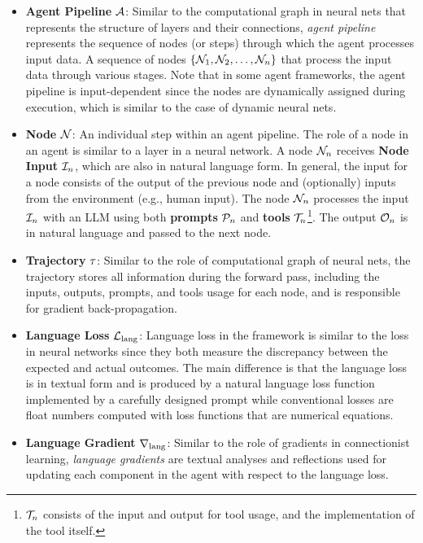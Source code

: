 \begin{itemize}
    
    \item \textbf{Agent Pipeline} $\mathcal{A}$: Similar to the computational graph in neural nets that represents the structure of layers and their connections, \textit{agent pipeline} represents the sequence of nodes (or steps) through which the agent processes input data. A sequence of nodes $\{\mathcal{N}_1, \mathcal{N}_2, \ldots, \mathcal{N}_n\}$ that process the input data through various stages. Note that in some agent frameworks, the agent pipeline is input-dependent since the nodes are dynamically assigned during execution, which is similar to the case of dynamic neural nets.

    \item \textbf{Node} $\mathcal{N}$: An individual step within an agent pipeline. The role of a node in an agent is similar to a layer in a neural network. A node $\mathcal{N}_n$ receives \textbf{Node Input} $\mathcal{I}_n$, which are also in natural language form. In general, the input for a node consists of the output of the previous node and (optionally) inputs from the environment (e.g., human input). The node $\mathcal{N}_n$ processes the input $\mathcal{I}_n$ with an LLM using both \textbf{prompts} $\mathcal{P}_n$ and \textbf{tools} $\mathcal{T}_n$\footnote{$\mathcal{T}_n$ consists of the input and output for tool usage, and the implementation of the tool itself.}. The output $\mathcal{O}_n$ is in natural language and passed to the next node.
        
        
    \item \textbf{Trajectory} $\tau$: Similar to the role of computational graph of neural nets, the trajectory stores all information during the forward pass, including the inputs, outputs, prompts, and tools usage for each node, and is responsible for gradient back-propagation.
    
    \item \textbf{Language Loss} $\mathcal{L}_{\text{lang}}$: Language loss in the \baby framework is similar to the loss in neural networks since they both measure the discrepancy between the expected and actual outcomes. The main difference is that the language loss is in textual form and is produced by a natural language loss function implemented by a carefully designed prompt while conventional losses are float numbers computed with loss functions that are numerical equations. 
    
    \item \textbf{Language Gradient} $\nabla_{\text{lang}}$: Similar to the role of gradients in connectionist learning, \textit{language gradients} are textual analyses and reflections used for updating each component in the agent with respect to the language loss.
\end{itemize}



